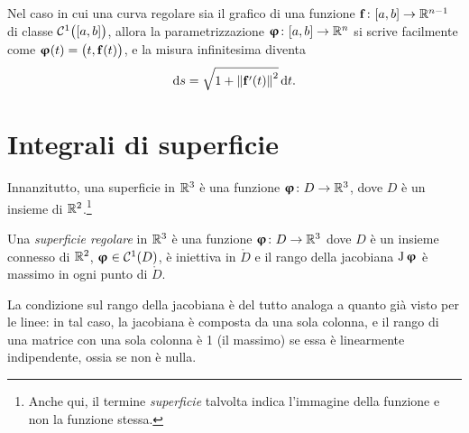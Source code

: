 Nel caso in cui una curva regolare sia il grafico di una funzione $\mathbf{f}\colon[a,b]\to\mathbb{R}^{n-1}$ di classe $\mathcal{C}^{{1}}\big([a,b]\big)$, allora la parametrizzazione $\bm{\upvarphi}\colon[a,b]\to\mathbb{R}^n$ si scrive facilmente come $\bm{\upvarphi}(t)=\big(t,\mathbf{f}(t)\big)$, e la misura infinitesima diventa
\begin{equation}
	\textup{d} s=\sqrt{1+\left\|{\mathbf{f}'(t)}\right\|^2}\,\textup{d} t.
\end{equation}

\section{Integrali di superficie}
Innanzitutto, una superficie in $\mathbb{R}^3$ è una funzione $\bm{\upvarphi}\colon D\to\mathbb{R}^3$, dove $D$ è un insieme di $\mathbb{R}^2$.\footnote{Anche qui, il termine \emph{superficie} talvolta indica l'immagine della funzione e non la funzione stessa.}
\begin{definizione} \label{d:superficie-regolare}
	Una \emph{superficie regolare} in $\mathbb{R}^3$ è una funzione $\bm{\upvarphi}\colon D\to\mathbb{R}^3$ dove $D$ è un insieme connesso di $\mathbb{R}^2$, $\bm{\upvarphi}\in\mathcal{C}^{{1}}(D)$, è iniettiva in $\mathring{D}$ e il rango della jacobiana $\operatorname{J}\bm{\upvarphi}$ è massimo in ogni punto di $\mathring{D}$.
\end{definizione}
La condizione sul rango della jacobiana è del tutto analoga a quanto già visto per le linee: in tal caso, la jacobiana è composta da una sola colonna, e il rango di una matrice con una sola colonna è 1 (il massimo) se essa è linearmente indipendente, ossia se non è nulla.

